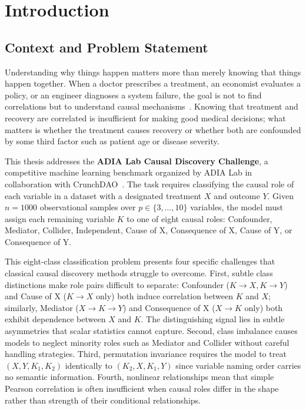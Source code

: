 \chapter{Introduction}
\label{chap:intro}

\section{Context and Problem Statement}
\label{sec:context}

Understanding why things happen matters more than merely knowing that things happen together. When a doctor prescribes a treatment, an economist evaluates a policy, or an engineer diagnoses a system failure, the goal is not to find correlations but to understand causal mechanisms~\cite{pearl2009causality}. Knowing that treatment and recovery are correlated is insufficient for making good medical decisions; what matters is whether the treatment causes recovery or whether both are confounded by some third factor such as patient age or disease severity.

This thesis addresses the \textbf{ADIA Lab Causal Discovery Challenge}, a competitive machine learning benchmark organized by ADIA Lab in collaboration with CrunchDAO~\cite{crunchdao_causal_2024, crunchdao_adia_docs}. The task requires classifying the causal role of each variable in a dataset with a designated treatment $X$ and outcome $Y$. Given $n=1000$ observational samples over $p\in\{3,\ldots,10\}$ variables, the model must assign each remaining variable $K$ to one of eight causal roles: Confounder, Mediator, Collider, Independent, Cause of X, Consequence of X, Cause of Y, or Consequence of Y.

This eight-class classification problem presents four specific challenges that classical causal discovery methods struggle to overcome. First, subtle class distinctions make role pairs difficult to separate: Confounder ($K\to X, K\to Y$) and Cause of X ($K\to X$ only) both induce correlation between $K$ and $X$; similarly, Mediator ($X\to K\to Y$) and Consequence of X ($X\to K$ only) both exhibit dependence between $X$ and $K$. The distinguishing signal lies in subtle asymmetries that scalar statistics cannot capture. Second, class imbalance causes models to neglect minority roles such as Mediator and Collider without careful handling strategies. Third, permutation invariance requires the model to treat $(X,Y,K_1,K_2)$ identically to $(K_2,X,K_1,Y)$ since variable naming order carries no semantic information. Fourth, nonlinear relationships mean that simple Pearson correlation is often insufficient when causal roles differ in the shape rather than strength of their conditional relationships.

